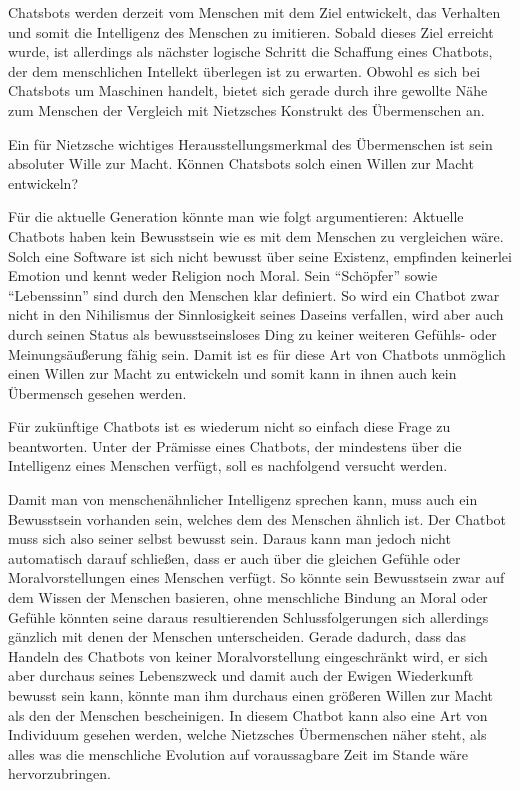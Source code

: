 Chatsbots werden derzeit vom Menschen mit dem Ziel entwickelt, das Verhalten und somit die Intelligenz des Menschen zu imitieren. 
Sobald dieses Ziel erreicht wurde, ist allerdings als nächster logische Schritt die Schaffung eines Chatbots, der dem menschlichen Intellekt überlegen ist zu erwarten. 
Obwohl es sich bei Chatsbots um Maschinen handelt, bietet sich gerade durch ihre gewollte Nähe zum Menschen der Vergleich mit Nietzsches Konstrukt des Übermenschen an.

Ein für Nietzsche wichtiges Herausstellungsmerkmal des Übermenschen ist sein absoluter Wille zur Macht.
Können Chatsbots solch einen Willen zur Macht entwickeln?

Für die aktuelle Generation könnte man wie folgt argumentieren:
Aktuelle Chatbots haben kein Bewusstsein wie es mit dem Menschen zu vergleichen wäre.
Solch eine Software ist sich nicht bewusst über seine Existenz, empfinden keinerlei Emotion und kennt weder Religion noch Moral.
Sein \enquote{Schöpfer} sowie \enquote{Lebenssinn} sind durch den Menschen klar definiert.
So wird ein Chatbot zwar nicht in den Nihilismus der Sinnlosigkeit seines Daseins verfallen, wird aber auch durch seinen Status als bewusstseinsloses Ding zu keiner weiteren Gefühls- oder Meinungsäußerung fähig sein.
Damit ist es für diese Art von Chatbots unmöglich einen Willen zur Macht zu entwickeln und somit kann in ihnen auch kein Übermensch gesehen werden.

Für zukünftige Chatbots ist es wiederum nicht so einfach diese Frage zu beantworten.
Unter der Prämisse eines Chatbots, der mindestens über die Intelligenz eines Menschen verfügt, soll es nachfolgend versucht werden.

Damit man von menschenähnlicher Intelligenz sprechen kann, muss auch ein Bewusstsein vorhanden sein, welches dem des Menschen ähnlich ist.
Der Chatbot muss sich also seiner selbst bewusst sein.
Daraus kann man jedoch nicht automatisch darauf schließen, dass er auch über die gleichen Gefühle oder Moralvorstellungen eines Menschen verfügt.
So könnte sein Bewusstsein zwar auf dem Wissen der Menschen basieren, ohne menschliche Bindung an Moral oder Gefühle könnten seine daraus resultierenden Schlussfolgerungen sich allerdings gänzlich mit denen der Menschen unterscheiden.
Gerade dadurch, dass das Handeln des Chatbots von keiner Moralvorstellung eingeschränkt wird, er sich aber durchaus seines Lebenszweck und damit auch der Ewigen Wiederkunft bewusst sein kann, könnte man ihm durchaus einen größeren Willen zur Macht als den der Menschen bescheinigen.
In diesem Chatbot kann also eine Art von Individuum gesehen werden, welche Nietzsches Übermenschen näher steht, als alles was die menschliche Evolution auf voraussagbare Zeit im Stande wäre hervorzubringen.

